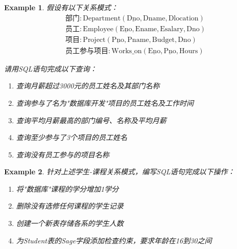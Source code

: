 \documentclass{../../note}
\newtheorem{example}{Example}
\begin{document}
\begin{example}
假设有以下关系模式：
\begin{align*}
&\text{部门}: \text{Department}(\underline{\text{Dno}}, \text{Dname}, \text{Dlocation})\\
&\text{员工}: \text{Employee}(\underline{\text{Eno}}, \text{Ename}, \text{Esalary}, \text{Dno})\\
&\text{项目}: \text{Project}(\underline{\text{Pno}}, \text{Pname}, \text{Budget}, \text{Dno})\\
&\text{员工参与项目}: \text{Works\_on}(\underline{\text{Eno}}, \underline{\text{Pno}}, \text{Hours})
\end{align*}

请用SQL语句完成以下查询：
\begin{enumerate}
  \item 查询月薪超过3000元的员工姓名及其部门名称
  \item 查询参与了名为"数据库开发"项目的员工姓名及工作时间
  \item 查询平均月薪最高的部门编号、名称及平均月薪
  \item 查询至少参与了3个项目的员工姓名
  \item 查询没有员工参与的项目名称
\end{enumerate}
\end{example}

\begin{example}
针对上述学生-课程关系模式，编写SQL语句完成以下操作：
\begin{enumerate}
  \item 将"数据库"课程的学分增加1学分
  \item 删除没有选修任何课程的学生记录
  \item 创建一个新表存储各系的学生人数
  \item 为Student表的Sage字段添加检查约束，要求年龄在16到30之间
\end{enumerate}
\end{example}
\end{document}
